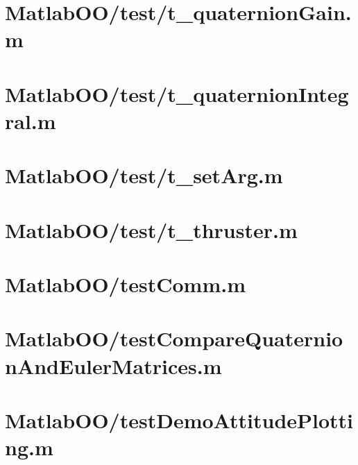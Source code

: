 \pagebreak
\section{MatlabOO/test/t\_quaternionGain.m}\label{code:MatlabOO/test/t_quaternionGain.m}


\pagebreak
\section{MatlabOO/test/t\_quaternionIntegral.m}\label{code:MatlabOO/test/t_quaternionIntegral.m}


\pagebreak
\section{MatlabOO/test/t\_setArg.m}\label{code:MatlabOO/test/t_setArg.m}


\pagebreak
\section{MatlabOO/test/t\_thruster.m}\label{code:MatlabOO/test/t_thruster.m}


\pagebreak
\section{MatlabOO/testComm.m}\label{code:MatlabOO/testComm.m}


\pagebreak
\section{MatlabOO/testCompareQuaternionAndEulerMatrices.m}\label{code:MatlabOO/testCompareQuaternionAndEulerMatrices.m}


\pagebreak
\section{MatlabOO/testDemoAttitudePlotting.m}\label{code:MatlabOO/testDemoAttitudePlotting.m}


